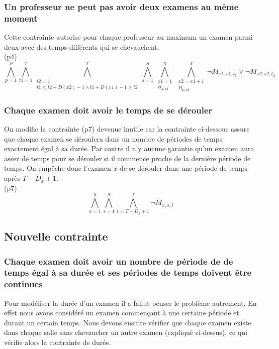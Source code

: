 \documentclass[a4paper,11pt]{article}
\begin{document}
\subsubsection{Un professeur ne peut pas avoir deux examens au même moment}
Cette contrainte autorise pour chaque professeur au maximum un examen parmi deux avec des temps différents qui se chevauchent.\\
(p4)
\begin{displaymath}
\bigwedge\limits_{p=1}^{P}\bigwedge\limits_{t1=1}^{T}\bigwedge\limits_{\substack{t2=1 \\ t1 \leq t2 + D(x2)-1 \wedge t1 + D(x1)-1 \geq t2}}^{T}\bigwedge\limits_{s=1}^{S}\bigwedge\limits_{\substack{x1=1 \\ B_{p,x1}}}^{X}\bigwedge\limits_{\substack{x2=x1+1 \\ B_{p,x2}}}^{X} \neg M_{x1, s1, t_{1}} \vee \neg M_{x2, s2, t_{2}}
\end{displaymath}

\subsubsection{Chaque examen doit avoir le temps de se dérouler}
On modifie la contrainte (p7) devenue inutile car la contrainte ci-dessous assure que chaque examen se déroulera dans un nombre de périodes de temps exactement égal à sa durée. Par contre il n'y aucune garantie qu'un examen aura assez de temps pour se dérouler si il commence proche de la dernière période de temps. On empêche donc l'examen $x$ de se dérouler dans une période de temps après $ T - D_{x} + 1 $.\\
(p7)
\begin{displaymath}
\bigwedge\limits_{x=1}^{X}\bigwedge\limits_{s=1}^{S}\bigwedge\limits_{t=T - D_{x} + 1}^{T} \neg M_{x, s, t}
\end{displaymath}


\subsection{Nouvelle contrainte}

\subsubsection{Chaque examen doit avoir un nombre de période de de temps égal à sa durée et ses périodes de temps doivent être continues}
Pour modéliser la durée d'un examen il a fallut penser le problème autrement. En effet nous avons considéré un examen commençant à une certaine période et durant un certain temps. Nous devons ensuite vérifier que chaque examen existe dans chaque salle sans chevaucher un autre examen (expliqué ci-dessus), ce qui vérifie alors la contrainte de durée.\\
\end{document}

